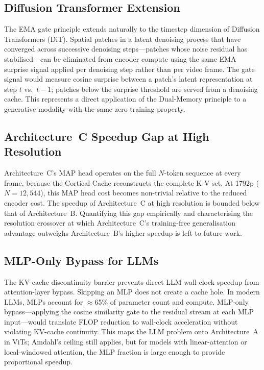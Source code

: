 \documentclass{article}
\begin{document}
\subsection{Diffusion Transformer Extension}
\label{sec:fw-dit}

The EMA gate principle extends naturally to the timestep dimension of
Diffusion Transformers (DiT). Spatial patches in a latent denoising process
that have converged across successive denoising steps---patches whose noise
residual has stabilised---can be eliminated from encoder compute using the
same EMA surprise signal applied per denoising step rather than per video
frame. The gate signal would measure cosine surprise between a patch's
latent representation at step $t$ vs.\ $t-1$; patches below the surprise
threshold are served from a denoising cache. This represents a direct
application of the Dual-Memory principle to a generative modality with the
same zero-training property.

\subsection{Architecture~C Speedup Gap at High Resolution}
\label{sec:limit-arch-c-highres}

Architecture~C's MAP head operates on the full $N$-token sequence at every
frame, because the Cortical Cache reconstructs the complete K-V set. At
1792p ($N = 12{,}544$), this MAP head cost becomes non-trivial relative to
the reduced encoder cost. The speedup of Architecture~C at high resolution
is bounded below that of Architecture~B. Quantifying this gap empirically
and characterising the resolution crossover at which Architecture~C's
training-free generalisation advantage outweighs Architecture~B's higher
speedup is left to future work.

\subsection{MLP-Only Bypass for LLMs}
\label{sec:fw-mlp-only}

The KV-cache discontinuity barrier prevents direct LLM wall-clock speedup
from attention-layer bypass. Skipping an MLP does not create a cache hole.
In modern LLMs, MLPs account for $\approx$65\% of parameter count and
compute. MLP-only bypass---applying the cosine similarity gate to the
residual stream at each MLP input---would translate FLOP reduction to
wall-clock acceleration without violating KV-cache continuity. This maps
the LLM problem onto Architecture~A in ViTs; Amdahl's ceiling still applies,
but for models with linear-attention or local-windowed attention, the MLP
fraction is large enough to provide proportional speedup.
\end{document}
